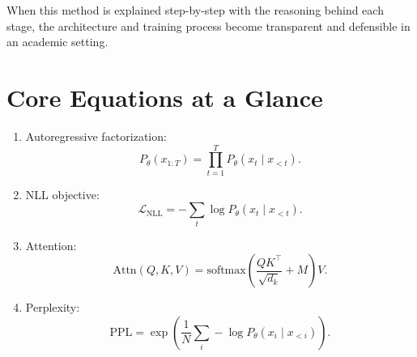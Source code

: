 \documentclass[12pt]{article}
\begin{document}
When this method is explained step-by-step with the reasoning behind each stage, the architecture and training process become transparent and defensible in an academic setting.

\appendix
\section{Core Equations at a Glance}

\begin{enumerate}
    \item Autoregressive factorization:
    \[
    P_\theta(x_{1:T})=\prod_{t=1}^{T}P_\theta(x_t\mid x_{<t}).
    \]
    \item NLL objective:
    \[
    \mathcal{L}_{\text{NLL}} = -\sum_t \log P_\theta(x_t\mid x_{<t}).
    \]
    \item Attention:
    \[
    \text{Attn}(Q,K,V)=\text{softmax}\!\left(\frac{QK^\top}{\sqrt{d_k}}+M\right)V.
    \]
    \item Perplexity:
    \[
    \text{PPL}=\exp\!\left(\frac{1}{N}\sum_i -\log P_\theta(x_i\mid x_{<i})\right).
    \]
\end{enumerate}
\end{document}
